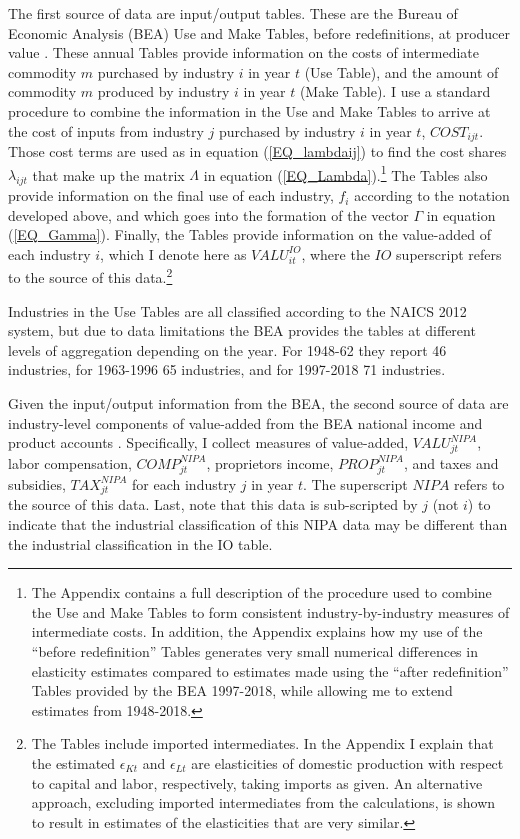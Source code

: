 \documentclass[11pt]{article}
\begin{document}
The first source of data are input/output tables. These are the Bureau of Economic Analysis (BEA) Use and Make Tables, before redefinitions, at producer value \citep{beaio}. These annual Tables provide information on the costs of intermediate commodity $m$ purchased by industry $i$ in year $t$ (Use Table), and the amount of commodity $m$ produced by industry $i$ in year $t$ (Make Table). I use a standard procedure to combine the information in the Use and Make Tables to arrive at the cost of inputs from industry $j$ purchased by industry $i$ in year $t$, $COST_{ijt}$. Those cost terms are used as in equation (\ref{EQ_lambdaij}) to find the cost shares $\lambda_{ijt}$ that make up the matrix $\Lambda$ in equation (\ref{EQ_Lambda}).\footnote{The Appendix contains a full description of the procedure used to combine the Use and Make Tables to form consistent industry-by-industry measures of intermediate costs. In addition, the Appendix explains how my use of the ``before redefinition'' Tables generates very small numerical differences in elasticity estimates compared to estimates made using the ``after redefinition'' Tables provided by the BEA 1997-2018, while allowing me to extend estimates from 1948-2018.} The Tables also provide information on the final use of each industry, $f_i$ according to the notation developed above, and which goes into the formation of the vector $\Gamma$ in equation (\ref{EQ_Gamma}). Finally, the Tables provide information on the value-added of each industry $i$, which I denote here as $VALU_{it}^{IO}$, where the $IO$ superscript refers to the source of this data.\footnote{The Tables include imported intermediates. In the Appendix I explain that the estimated $\epsilon_{Kt}$ and $\epsilon_{Lt}$ are elasticities of domestic production with respect to capital and labor, respectively, taking imports as given. An alternative approach, excluding imported intermediates from the calculations, is shown to result in estimates of the elasticities that are very similar.}

Industries in the Use Tables are all classified according to the NAICS 2012 system, but due to data limitations the BEA provides the tables at different levels of aggregation depending on the year. For 1948-62 they report 46 industries, for 1963-1996 65 industries, and for 1997-2018 71 industries. 

Given the input/output information from the BEA, the second source of data are industry-level components of value-added from the BEA national income and product accounts \citep{beasection6,beahistind}. Specifically, I collect measures of value-added, $VALU_{jt}^{NIPA}$, labor compensation, $COMP_{jt}^{NIPA}$, proprietors income, $PROP_{jt}^{NIPA}$, and taxes and subsidies, $TAX_{jt}^{NIPA}$ for each industry $j$ in year $t$. The superscript $NIPA$ refers to the source of this data. Last, note that this data is sub-scripted by $j$ (not $i$) to indicate that the industrial classification of this NIPA data may be different than the industrial classification in the IO table.
\end{document}
